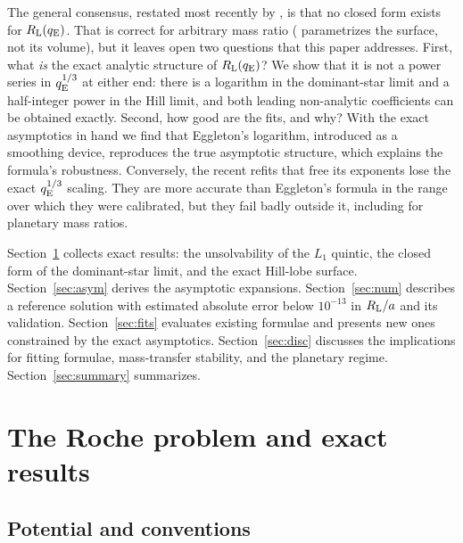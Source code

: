 \documentclass[twocolumn]{aastex702}
\newcommand{\qE}{q_{\rm E}}
\newcommand{\RL}{R_{\rm L}}
\begin{document}
The general consensus, restated most recently by \citet{Qi2026}, is that no closed form exists for $\RL(\qE)$. That is correct for arbitrary mass ratio (\citet{Hure2026} parametrizes the surface, not its volume), but it leaves open two questions that this paper addresses. First, what {\em is} the exact analytic structure of $\RL(\qE)$? We show that it is not a power series in $\qE^{1/3}$ at either end: there is a logarithm in the dominant-star limit and a half-integer power in the Hill limit, and both leading non-analytic coefficients can be obtained exactly. Second, how good are the fits, and why? With the exact asymptotics in hand we find that Eggleton's logarithm, introduced as a smoothing device, reproduces the true asymptotic structure, which explains the formula's robustness. Conversely, the recent refits that free its exponents \citep{LeahyLeahy2015,Qi2026} lose the exact $\qE^{1/3}$ scaling. They are more accurate than Eggleton's formula in the range over which they were calibrated, but they fail badly outside it, including for planetary mass ratios.

Section~\ref{sec:exact} collects exact results: the unsolvability of the $L_1$ quintic, the closed form of the dominant-star limit, and the exact Hill-lobe surface. Section~\ref{sec:asym} derives the asymptotic expansions. Section~\ref{sec:num} describes a reference solution with estimated absolute error below $10^{-13}$ in $\RL/a$ and its validation. Section~\ref{sec:fits} evaluates existing formulae and presents new ones constrained by the exact asymptotics. Section~\ref{sec:disc} discusses the implications for fitting formulae, mass-transfer stability, and the planetary regime. Section~\ref{sec:summary} summarizes.

\section{The Roche problem and exact results}\label{sec:exact}

\subsection{Potential and conventions}
\end{document}

